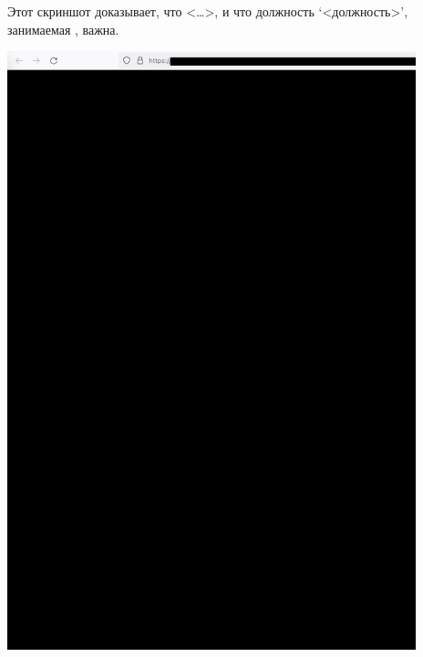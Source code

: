 
Этот скриншот доказывает, что <\dots>,
и что должность `<должность>', занимаемая \MrPhpTwo, важна.

\begin{center}
    \includegraphics[width=32em]{php-two-company-about_public}
\end{center}

\pagebreak
